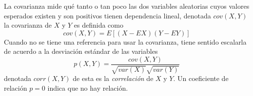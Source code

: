 La covarianza mide qué tanto o tan poco las dos variables aleatorias cuyos valores esperados existen y son positivos tienen dependencia lineal, denotada $cov(X,Y)$ la covarianza de $X$ y $Y$ es definida como
\begin{equation}
cov(X,Y)=E[(X-EX)(Y-EY)]
\end{equation}
Cuando no se tiene una referencia para usar la covarianza, tiene sentido escalarla de acuerdo a la desviación estándar de las variables\cite{mat17}
\begin{equation}
p(X,Y)=\frac{cov(X,Y)}{\sqrt{var(X)}\sqrt{var(Y)}}
\end{equation}
denotada $corr(X,Y)$ de esta es la \emph{correlación} de $X$ y $Y$. Un coeficiente de relación $p = 0$ indica que no hay relación.